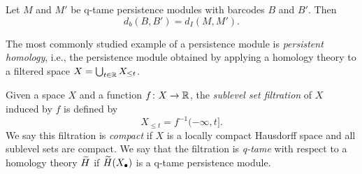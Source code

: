 \begin{thm}
Let $M$ and $M'$ be q-tame persistence modules with barcodes $B$ and $B'$. Then
\[
d_{b}(B,B')= d_{I}(M,M').
\]
\end{thm}

The most commonly studied example of a persistence module is \emph{persistent homology}, i.e., the persistence module obtained by applying a homology theory to a filtered space $X = \bigcup_{t \in \mathbb{R}} X_{\leq t}$.

\begin{defi}
Given a space $X$ and a function $f \colon X \to \mathbb{R}$, the \textit{sublevel set filtration} of $X$ induced by $f$ is defined by
\begin{equation*}
X_{\leq t} = f^{-1}(-\infty, t].
\end{equation*}
We say this filtration is \textit{compact} if $X$ is a locally compact Hausdorff space and all sublevel sets are compact. We say that the filtration is \emph{q-tame} with respect to a homology theory $\widetilde{H}$ if $\widetilde{H} (X_{\bullet})$ is a q-tame persistence module.
\end{defi}




